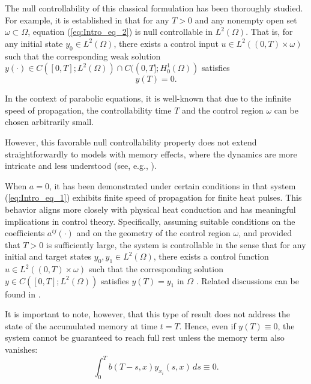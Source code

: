\documentclass[12pt]{article}
\theoremstyle{plain}
\theoremstyle{definition}
\begin{document}
The null controllability of this classical formulation has been thoroughly studied. For example, it is established in \cite{fursikov1996controllability} that for any \( T > 0 \) and any nonempty open set \( \omega \subset \Omega \), equation (\ref{eq:Intro_eq_2}) is null controllable in \( L^2(\Omega) \). That is, for any initial state \( y_0 \in L^2(\Omega) \), there exists a control input \( u \in L^2((0,T) \times \omega) \) such that the corresponding weak solution \( y(\cdot) \in C([0,T]; L^2(\Omega)) \cap C((0,T]; H_0^1(\Omega)) \) satisfies
\begin{equation}\label{eq:Intro_eq_3}
    y(T) = 0.
\end{equation}

In the context of parabolic equations, it is well-known that due to the infinite speed of propagation, the controllability time $T$ and the control region $\omega$ can be chosen arbitrarily small.

However, this favorable null controllability property does not extend straightforwardly to models with memory effects, where the dynamics are more intricate and less understood (see, e.g., \cite{guerrero2013remarks,halanay2012lack}).

When $a = 0$, it has been demonstrated under certain conditions in \cite{yong2011heat} that system (\ref{eq:Intro_eq_1}) exhibits finite speed of propagation for finite heat pulses. This behavior aligns more closely with physical heat conduction and has meaningful implications in control theory. Specifically, assuming suitable conditions on the coefficients $a^{ij}(\cdot)$ and on the geometry of the control region $\omega$, and provided that $T > 0$ is sufficiently large, the system is controllable in the sense that for any initial and target states $y_0, y_1 \in L^2(\Omega)$, there exists a control function $u \in L^2((0,T) \times \omega)$ such that the corresponding solution $y \in C([0,T]; L^2(\Omega))$ satisfies $y(T) = y_1$ in $\Omega$ \cite{fu2009controllability}. Related discussions can be found in \cite{castro2013exact,russell1978controllability,liu1999rapid,zhang2010unified}.

It is important to note, however, that this type of result does not address the state of the accumulated memory at time $t = T$. Hence, even if $y(T) \equiv 0$, the system cannot be guaranteed to reach full rest unless the memory term also vanishes:
\begin{equation}\label{eq:Intro_eq_4}
    \int_0^T b(T - s, x) y_{x_i}(s,x)\, ds \equiv 0.
\end{equation}
\end{document}
